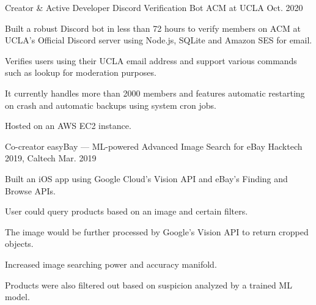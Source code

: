 
\begin{cventries}

  \cventry
    {Creator \& Active Developer} %
    {Discord Verification Bot} %
    {ACM at UCLA} %
    {Oct. 2020} %
    {
      \begin{cvitems} %
        \item {Built a robust Discord bot in less than 72 hours to verify members on ACM at UCLA’s Official Discord server using Node.js, SQLite and Amazon SES for email.}
        \item{Verifies users using their UCLA email address and support various commands such as lookup for moderation purposes.}
        \item{It currently handles more than 2000 members and features automatic restarting on crash and automatic backups using system cron jobs.}
        \item{Hosted on an AWS EC2 instance.}
      \end{cvitems}
    }


\cventry
    {Co-creator} %
    {easyBay — ML-powered Advanced Image Search for eBay} %
    {Hacktech 2019, Caltech} %
    {Mar. 2019} %
    {
      \begin{cvitems} %
        \item{Built an iOS app using Google Cloud’s Vision API and eBay’s Finding and Browse APIs.}
        \item{User could query products based on an image and certain filters.}
        \item{The image would be further processed by Google’s Vision API to return cropped objects.}
        \item{Increased image searching power and accuracy manifold.}
        \item{Products were also filtered out based on suspicion analyzed by a trained ML model.}
      \end{cvitems}
    }


\end{cventries}
